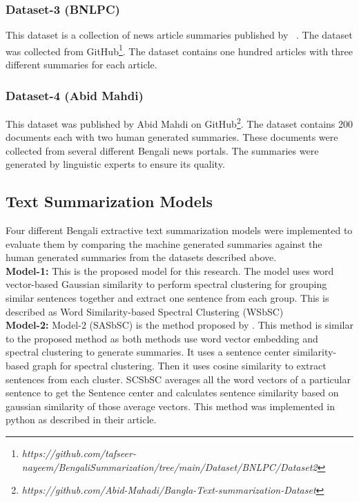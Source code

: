 \subsubsection{Dataset-3 (BNLPC)\cite{Hque-2015-BNLPC-Dataset}}
This dataset is a collection of news article summaries published by \citeauthor{Hque-2015-BNLPC-Dataset}~\cite{Hque-2015-BNLPC-Dataset}. The dataset was collected from GitHub\footnote{\textit{https://github.com/tafseer-nayeem/BengaliSummarization/tree/main/Dataset/BNLPC/Dataset2}}. The dataset contains one hundred articles with three different summaries for each article.

\subsubsection{Dataset-4 (Abid Mahdi)}
This dataset was published by Abid Mahdi on GitHub\footnote{\textit{https://github.com/Abid-Mahadi/Bangla-Text-summarization-Dataset}}. The dataset contains 200 documents each with two human generated summaries. These documents were collected from several different Bengali news portals. The summaries were generated by linguistic experts to ensure its quality.

\subsection{Text Summarization Models}\label{subsec:text-summarization-models}
Four different Bengali extractive text summarization models were implemented to evaluate them by comparing the machine generated summaries against the human generated summaries from the datasets described above.\\

\textbf{Model-1:} This is the proposed model for this research.
The model uses word vector-based Gaussian similarity to perform spectral clustering for grouping similar sentences together and extract one sentence from each group. This is described as Word Similarity-based Spectral Clustering (WSbSC)\\

\textbf{Model-2:} Model-2 (SASbSC) is the method proposed by \citeauthor{roychowdhury-etal-2022-spectral-base} \cite{roychowdhury-etal-2022-spectral-base}. This method is similar to the proposed method as both methods use word vector embedding and spectral clustering to generate summaries. It uses a sentence center similarity-based graph for spectral clustering. Then it uses cosine similarity to extract sentences from each cluster. SCSbSC averages all the word vectors of a particular sentence to get the Sentence center and calculates sentence similarity based on gaussian similarity of those average vectors. This method was implemented in python as described in their article.\\

